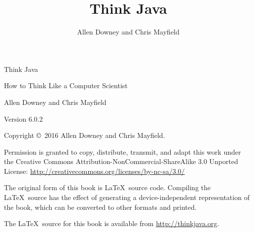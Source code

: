 \documentclass[12pt]{book}
\title{Think Java}
\author{Allen Downey and Chris Mayfield}
\newcommand{\theauthors}{Allen Downey and Chris Mayfield}
\newcommand{\theversion}{Version 6.0.2}
\theoremstyle{exercise}
\newif\ifplastex
\begin{document}
\frontmatter

\ifplastex
    \maketitle

\else

\pagebreak
\thispagestyle{empty}

\begin{flushright}
\vspace*{2.0in}

{\huge Think Java}

\vspace{0.25in}
{\LARGE How to Think Like a Computer Scientist}

\vspace{1in}
{\Large \theauthors}

\vspace{1in}
{\large \theversion}

\vfill

\end{flushright}

\pagebreak
\thispagestyle{empty}

Copyright \copyright ~2016 Allen Downey and Chris Mayfield.


\vspace{0.25in}

Permission is granted to copy, distribute, transmit, and adapt this work under the Creative Commons Attribution-NonCommercial-ShareAlike 3.0 Unported License: \url{http://creativecommons.org/licenses/by-nc-sa/3.0/}

The original form of this book is \LaTeX\ source code.
Compiling the \LaTeX\ source has the effect of generating a device-independent representation of the book, which can be converted to other formats and printed.

The \LaTeX\ source for this book is available from \url{http://thinkjava.org}.


\cleardoublepage
\setcounter{tocdepth}{1}
\tableofcontents

\fi
\end{document}
